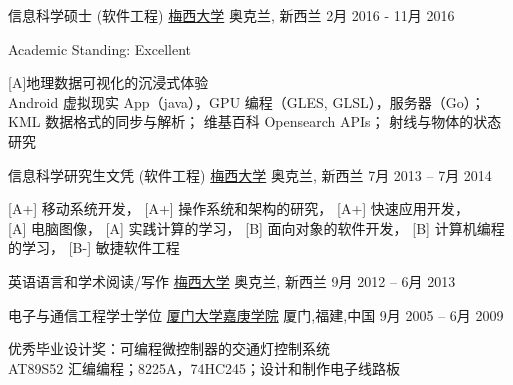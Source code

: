 
\begin{cventries}
\cventry
{信息科学硕士 (软件工程)}
{\href{http://www.massey.ac.nz/}{梅西大学}}
{奥克兰, \enskip 新西兰}
{2月 2016 - 11月 2016}
{
	\begin{cvitems}
		\item{Academic Standing: Excellent}
		\item {[A]地理数据可视化的沉浸式体验\\
			Android 虚拟现实 App（java），GPU 编程（GLES, GLSL），服务器（Go）；\\
			KML 数据格式的同步与解析；
			维基百科 Opensearch APIs；
			射线与物体的状态研究}
	\end{cvitems}
}
\end{cventries}

\begin{cventries}
	\cventry
	{信息科学研究生文凭 (软件工程)}
	{\href{http://www.massey.ac.nz/}{梅西大学}}
	{奥克兰, \enskip 新西兰}
	{7月 2013 – 7月 2014}
	{
		\begin{cvitems}
			\item{[A+] 移动系统开发}，
			{[A+] 操作系统和架构的研究}，
			{[A+] 快速应用开发}，\\
			{[A] 电脑图像}，
			{[A] 实践计算的学习}，
			{[B] 面向对象的软件开发}，
			{[B] 计算机编程的学习}，
			{[B-] 敏捷软件工程}
		\end{cvitems}
	}
\end{cventries}

\begin{cventries}
	\cventry
	{英语语言和学术阅读/写作}
	{\href{http://www.massey.ac.nz/}{梅西大学}}
	{奥克兰, \enskip 新西兰}
	{9月 2012 – 6月 2013}
	{
		\begin{cvitems}
		\end{cvitems}
	}
\end{cventries}

\begin{cventries}
	\cventry
	{电子与通信工程学士学位}
	{\href{http://www.xmu.edu.cn/en/}{厦门大学嘉庚学院}}
	{厦门,\enskip 福建,\enskip 中国}
	{9月 2005 – 6月 2009}
	{
		\begin{cvitems}
			\item {优秀毕业设计奖：可编程微控制器的交通灯控制系统\\
			AT89S52 汇编编程；8225A，74HC245；设计和制作电子线路板}
		\end{cvitems}
	}
\end{cventries}


